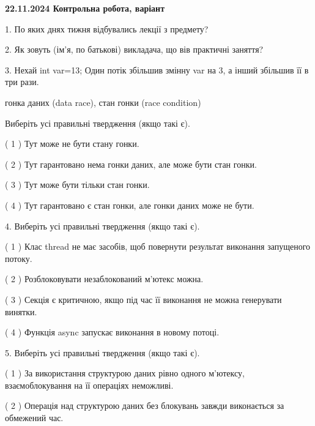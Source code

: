 \documentclass[12pt, ukrainian]{article}
\begin{document}
\begin {large}

\textbf{22.11.2024 Контрольна робота, варіант  }\par


{
1. По яких днях тижня відбувались лекції з предмету?



\vspace{5mm}
2. Як зовуть (ім'я, по батькові) викладача, що вів практичні заняття?



\vspace{5mm}
3. Нехай int var=13; Один потік збільшив змінну var на 3, а інший збільшив її в три рази.

гонка даних (data race), стан гонки (race condition)

Виберіть усі правильні твердження (якщо такі є).\par
\vspace{2mm}
( 1 ) Тут може не бути стану гонки.%

( 2 ) Тут гарантовано нема гонки даних, але може бути стан гонки.%

( 3 ) Тут може бути тільки стан гонки.%

( 4 ) Тут гарантовано є стан гонки, але гонки даних може не бути.%


\vspace{5mm}
4. Виберіть усі правильні твердження (якщо такі є).\par
\vspace{2mm}

( 1 ) Клас thread не має засобів, щоб повернути результат виконання запущеного потоку.%

( 2 ) Розблоковувати незаблокований м’ютекс можна.%

( 3 ) Секція є критичною, якщо під час її виконання не можна генерувати винятки.%

( 4 ) Функція async запускає виконання в новому потоці.%


\vspace{5mm}
5. Виберіть усі правильні твердження (якщо такі є).\par
\vspace{2mm}

( 1 ) За використання структурою даних рівно одного м’ютексу, взаємоблокування на її операціях неможливі.%

( 2 ) Операція над структурою даних без блокувань завжди виконається за обмежений час.%

}
\end{large}
\end{document}
